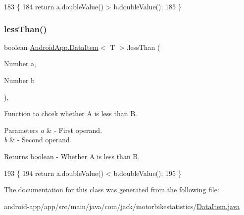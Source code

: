 \begin{DoxyCode}
183                                                     \{
184         \textcolor{keywordflow}{return} a.doubleValue() > b.doubleValue();
185     \}
\end{DoxyCode}
\mbox{\label{class_android_app_1_1_data_item_a94d948e8d1922c116246402c633109fc}} 
\subsubsection{\texorpdfstring{less\+Than()}{lessThan()}}
{\footnotesize\ttfamily boolean \hyperlink{class_android_app_1_1_data_item}{Android\+App.\+Data\+Item}$<$ T $>$.less\+Than (\begin{DoxyParamCaption}\item[{Number}]{a,  }\item[{Number}]{b }\end{DoxyParamCaption})\hspace{0.3cm}{\ttfamily [inline]}, {\ttfamily [private]}}



Function to chcek whether A is less than B. 


\begin{DoxyParams}{Parameters}
{\em a} & -\/ First operand. \\
\hline
{\em b} & -\/ Second operand. \\
\hline
\end{DoxyParams}
\begin{DoxyReturn}{Returns}
boolean -\/ Whether A is less than B. 
\end{DoxyReturn}

\begin{DoxyCode}
193                                                  \{
194         \textcolor{keywordflow}{return} a.doubleValue() < b.doubleValue();
195     \}
\end{DoxyCode}


The documentation for this class was generated from the following file\+:\begin{DoxyCompactItemize}
\item 
android-\/app/app/src/main/java/com/jack/motorbikestatistics/\hyperlink{_data_item_8java}{Data\+Item.\+java}\end{DoxyCompactItemize}

